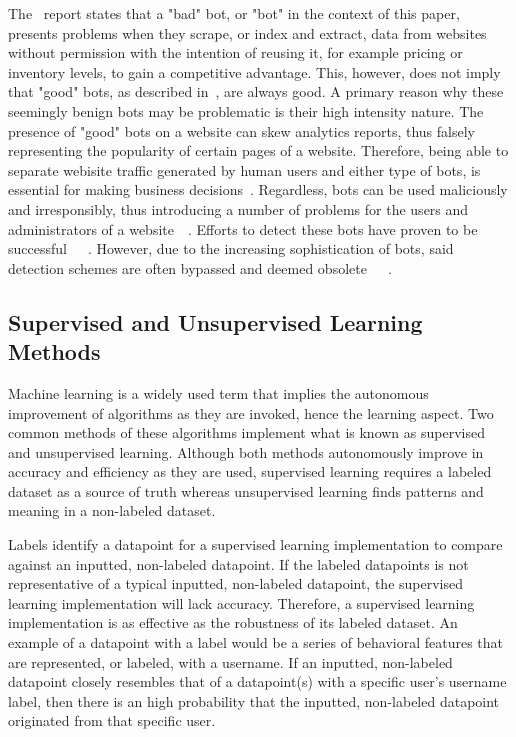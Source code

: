 The~\cite{bad_bot_report} report states that a "bad" bot, or "bot" in the context of this paper, presents problems when they scrape, or index and extract, data from websites without permission with the intention of reusing it, for example pricing or inventory levels, to gain a competitive advantage.
This, however, does not imply that "good" bots, as described in~\cite{bad_bot_report}, are always good.
A primary reason why these seemingly benign bots may be problematic is their high intensity nature.
The presence of "good" bots on a website can skew analytics reports, thus falsely representing the popularity of certain pages of a website.
Therefore, being able to separate webisite traffic generated by human users and either type of bots, is essential for making business decisions~\cite{bad_bot_report}.
Regardless, bots can be used maliciously and irresponsibly, thus introducing a number of problems for the users and administrators of a website~\cite{1ee426975c3d46d2ba6ef5c2d76384c5}~\cite{bad_bot_report}.
Efforts to detect these bots have proven to be successful~\cite{akamai_bot_detection}~\cite{Hamidzadeh2018}~\cite{ZABIHIMAYVAN2017129}.
However, due to the increasing sophistication of bots, said detection schemes are often bypassed and deemed obsolete~\cite{ROVETTA2020102577}~\cite{STEVANOVIC2013698}~\cite{10.1109/DSN.2013.6575366}.

\subsection{Supervised and Unsupervised Learning Methods}\label{subsec:supervised-and-unsupervised-learning-methods}
Machine learning is a widely used term that implies the autonomous improvement of algorithms as they are invoked, hence the learning aspect.
Two common methods of these algorithms implement what is known as supervised and unsupervised learning.
Although both methods autonomously improve in accuracy and efficiency as they are used, supervised learning requires a labeled dataset as a source of truth whereas unsupervised learning finds patterns and meaning in a non-labeled dataset.

Labels identify a datapoint for a supervised learning implementation to compare against an inputted, non-labeled datapoint.
If the labeled datapoints is not representative of a typical inputted, non-labeled datapoint, the supervised learning implementation will lack accuracy.
Therefore, a supervised learning implementation is as effective as the robustness of its labeled dataset.
An example of a datapoint with a label would be a series of behavioral features that are represented, or labeled, with a username.
If an inputted, non-labeled datapoint closely resembles that of a datapoint(s) with a specific user's username label, then there is an high probability that the inputted, non-labeled datapoint originated from that specific user.

